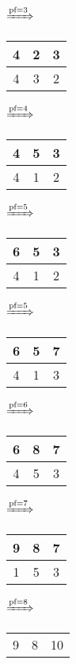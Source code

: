 \documentclass{article}
\begin{document}
\begin{itemize}
\begin{tabular}{|c|c|c|}
                \hline
            \end{tabular}
            $\xRightarrow{\text{pf}=3}$
            \begin{tabular}{|c|c|c|}
                \hline
                4 & 2 & 3\\
                \hline
                4 & 3 & 2\\
                \hline
            \end{tabular}
            $\xRightarrow{\text{pf}=4}$
            \begin{tabular}{|c|c|c|}
                \hline
                4 & 5 & 3\\
                \hline
                4 & 1 & 2\\
                \hline
            \end{tabular}
            $\xRightarrow{\text{pf}=5}$
            \begin{tabular}{|c|c|c|}
                \hline
                6 & 5 & 3\\
                \hline
                4 & 1 & 2\\
                \hline
            \end{tabular}
            $\xRightarrow{\text{pf}=5}$
            \begin{tabular}{|c|c|c|}
                \hline
                6 & 5 & 7\\
                \hline
                4 & 1 & 3\\
                \hline
            \end{tabular}
            $\xRightarrow{\text{pf}=6}$
            \begin{tabular}{|c|c|c|}
                \hline
                6 & 8 & 7\\
                \hline
                4 & 5 & 3\\
                \hline
            \end{tabular}
            $\xRightarrow{\text{pf}=7}$
            \begin{tabular}{|c|c|c|}
                \hline
                9 & 8 & 7\\
                \hline
                1 & 5 & 3\\
                \hline
            \end{tabular}
            $\xRightarrow{\text{pf}=8}$
            \begin{tabular}{|c|c|c|}
                \hline
                9 & 8 & 10\\

\end{tabular}
\end{itemize}
\end{document}
